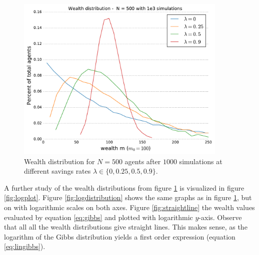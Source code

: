 \documentclass[10pt, a4paper]{amsart}
\begin{document}
\begin{figure}
	\centering
	\includegraphics[width=0.9\textwidth]{../figures/5ac/5c_N500_varSavings.pdf}
	\caption{Wealth distribution for $N=500$ agents after $1000$ simulations at different savings rates $\lambda \in \{0,0.25,0.5,0.9\}$.}
	\label{fig:distribution}
\end{figure}

A further study of the wealth distributions from figure \ref{fig:distribution} is visualized in figure \ref{fig:logplot}. Figure  \ref{fig:logdistribution} shows the same graphs as in figure \ref{fig:distribution}, but on with logarithmic scales on both axes. Figure \ref{fig:straightline} the wealth values evaluated by equation \ref{eq:gibbs} and plotted with logarithmic $y$-axis. Observe that all all the wealth distributions give straight lines. This makes sense, as the logarithm of the Gibbs distribution yields a first order expression (equation \ref{eq:lingibbs}).
\end{document}
